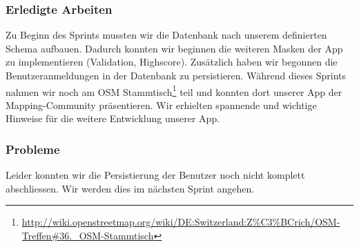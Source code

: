 \subsubsection{Erledigte Arbeiten}
Zu Beginn des Sprints mussten wir die Datenbank nach unserem definierten Schema aufbauen.
Dadurch konnten wir beginnen die weiteren Masken der App zu implementieren (Validation, Highscore).
Zusätzlich haben wir begonnen die Benutzeranmeldungen in der Datenbank zu persistieren.
Während dieses Sprints nahmen wir noch am OSM Stammtisch\footnote{\url{http://wiki.openstreetmap.org/wiki/DE:Switzerland:Z\%C3\%BCrich/OSM-Treffen\#36._OSM-Stammtisch}} teil und konnten dort unserer App der Mapping-Community präsentieren.
Wir erhielten spannende und wichtige Hinweise für die weitere Entwicklung unserer App.

\subsubsection{Probleme}
Leider konnten wir die Persistierung der Benutzer noch nicht komplett abschliessen.
Wir werden dies im nächsten Sprint angehen.